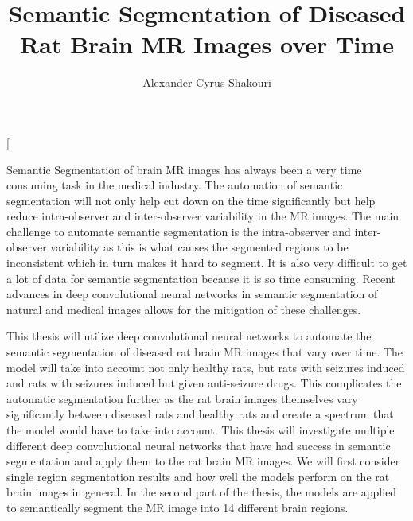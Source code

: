 \documentclass[13pt,MS]{ucdavisthesis}
\title          {Semantic Segmentation of Diseased Rat Brain MR Images over Time}
\author         {Alexander Cyrus Shakouri}
\begin{document}
\newcommand{\bibfont}{\singlespacing}

%


\makeintropages %










\UMIabstract[
\par
Semantic Segmentation of brain MR images has always been a very time consuming task in the medical industry.
The automation of semantic segmentation will not only help cut down on the time significantly but help reduce intra-observer and inter-observer variability in the MR images. 
The main challenge to automate semantic segmentation is the intra-observer and inter-observer variability as this is what causes the segmented regions to be inconsistent which in turn makes it hard to segment. 
It is also very difficult to get a lot of data for semantic segmentation because it is so time consuming.
Recent advances in deep convolutional neural networks in semantic segmentation of natural and medical images allows for the mitigation of these challenges. 
\par
This thesis will utilize deep convolutional neural networks to automate the semantic segmentation of diseased rat brain MR images that vary over time. 
The model will take into account not only healthy rats, but rats with seizures induced and rats with seizures induced but given anti-seizure drugs. 
This complicates the automatic segmentation further as the rat brain images themselves vary significantly between diseased rats and healthy rats and create a spectrum that the model would have to take into account. 
This thesis will investigate multiple different deep convolutional neural networks that have had success in semantic segmentation and apply them to the rat brain MR images.
We will first consider single region segmentation results and how well the models perform on the rat brain images in general.
In the second part of the thesis, the models are applied to semantically segment the MR image into 14 different brain regions.
\end{document}
